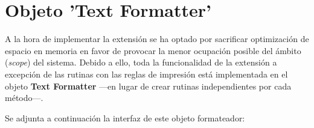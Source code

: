 \documentclass[a4paper,12pt]{article}
\numberwithin{equation}{section}
\begin{document}

\section{Objeto 'Text Formatter'} \label{sec:objeto-text-formatter}

A la hora de implementar la extensión se ha optado por sacrificar optimización de espacio en memoria en favor de provocar la menor ocupación posible del ámbito (\emph{scope}) del sistema. Debido a ello, toda la funcionalidad de la extensión a excepción de las rutinas con las reglas de impresión está implementada en el objeto \textbf{Text Formatter} ---en lugar de crear rutinas independientes por cada método---.

Se adjunta a continuación la interfaz de este objeto formateador:
\end{document}
